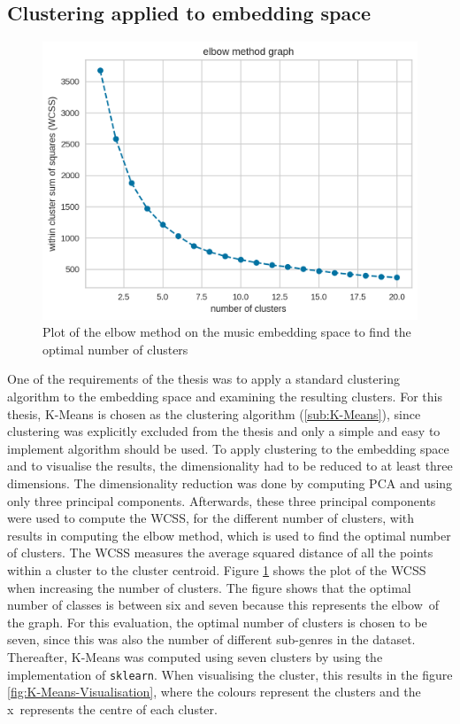 \subsection{Clustering applied to embedding space}
\label{sub:Results-Music-Clustering}
\begin{figure}[ht]
\centering
    \includegraphics[width=0.6\linewidth]{img/elbow_method_music_dataset.png}
    \caption{Plot of the elbow method on the music embedding space to find the optimal number of clusters}
    \label{fig:Elbow-Clusters}
\end{figure}
\noindent
One of the requirements of the thesis was to apply a standard clustering algorithm to the embedding space and examining the resulting clusters. For this thesis, K-Means is chosen as the clustering algorithm (\ref{sub:K-Means}), since clustering was explicitly excluded from the thesis and only a simple and easy to implement algorithm should be used. To apply clustering to the embedding space and to visualise the results, the dimensionality had to be reduced to at least three dimensions. The dimensionality reduction was done by computing \gls{PCA} and using only three principal components. Afterwards, these three principal components were used to compute the \gls{WCSS}, for the different number of clusters, with results in computing the elbow method, which is used to find the optimal number of clusters. The \gls{WCSS} measures the average squared distance of all the points within a cluster to the cluster centroid. Figure \ref{fig:Elbow-Clusters} shows the plot of the \gls{WCSS} when increasing the number of clusters. The figure shows that the optimal number of classes is between six and seven because this represents the \flqq elbow\frqq \ of the graph. For this evaluation, the optimal number of clusters is chosen to be seven, since this was also the number of different sub-genres in the dataset. Thereafter, K-Means was computed using seven clusters by using the implementation of \texttt{sklearn}. When visualising the cluster, this results in the figure \ref{fig:K-Means-Visualisation}, where the colours represent the clusters and the \flqq x\frqq \ represents the centre of each cluster.
